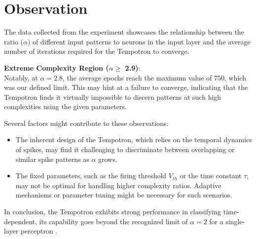 \section{Observation}

The data collected from the experiment showcases the relationship between the ratio (\( \alpha \)) of different input patterns to neurons in the input layer and the average number of iterations required for the Tempotron to converge.

\textbf{Extreme Complexity Region (\( \alpha \geq\) 2.9)}: \\
Notably, at \( \alpha = 2.8 \), the average epochs reach the maximum value of 750, which was our defined limit. This may hint at a failure to converge, indicating that the Tempotron finds it virtually impossible to discern patterns at such high complexities using the given parameters.

Several factors might contribute to these observations:

\begin{itemize}
    \item The inherent design of the Tempotron, which relies on the temporal dynamics of spikes, may find it challenging to discriminate between overlapping or similar spike patterns as \( \alpha \) grows.
    
    \item The fixed parameters, such as the firing threshold \( V_{th} \) or the time constant \( \tau \), may not be optimal for handling higher complexity ratios. Adaptive mechanisms or parameter tuning might be necessary for such scenarios.
    
\end{itemize}

In conclusion, the Tempotron exhibits strong performance in classifying time-dependent, its capability goes beyond the recognized limit of \( \alpha = 2 \) for a single-layer perceptron \cite{gutig2006tempotron}.



